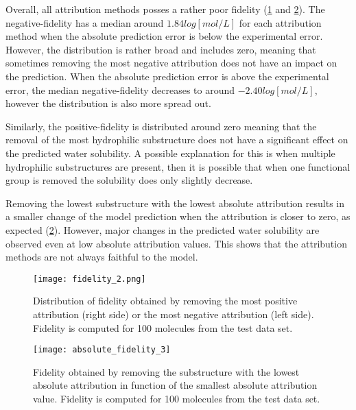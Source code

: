 Overall, all attribution methods posses a rather poor fidelity (\cref{fig:fidelity} and \cref{fig:absolute_fidelity}). 
The negative-fidelity has a median around $1.84 log[mol/L]$ for each attribution method when the absolute 
prediction error is below the experimental error. However, the distribution is rather 
broad and includes zero, meaning that sometimes removing the most negative attribution 
does not have an impact on the prediction. When the absolute prediction error is above 
the experimental error, the median negative-fidelity decreases to around $-2.40 log[mol/L]$, 
however the distribution is also more spread out. 


Similarly, the positive-fidelity is distributed around zero meaning that the removal of 
the most hydrophilic substructure does not have a significant effect on the predicted 
water solubility. A possible explanation for this is when multiple hydrophilic substructures 
are present, then it is possible that when one functional group is removed the solubility 
does only slightly decrease. 


Removing the lowest substructure with the lowest absolute attribution results in a 
smaller change of the model prediction when the attribution is closer to zero, as expected (\cref{fig:absolute_fidelity}).
However, major changes in the predicted water solubility are observed even at low absolute 
attribution values. This shows that the attribution methods are not always faithful to the model. 


\begin{figure}[h]
    \centering
    \texttt{[image: fidelity\_2.png]}
    \caption{Distribution of fidelity obtained by removing the most positive 
        attribution (right side) or the most negative attribution (left side).
        Fidelity is computed for 100 molecules from the test data set.
    }
    \label{fig:fidelity}
\end{figure}


\begin{figure}[h]
    \centering
    \texttt{[image: absolute\_fidelity\_3]}
    \caption{Fidelity obtained by removing the substructure 
        with the lowest absolute attribution in function of the smallest absolute attribution value.
        Fidelity is computed for 100 molecules from the test data set.
    }
    \label{fig:absolute_fidelity}
\end{figure}
